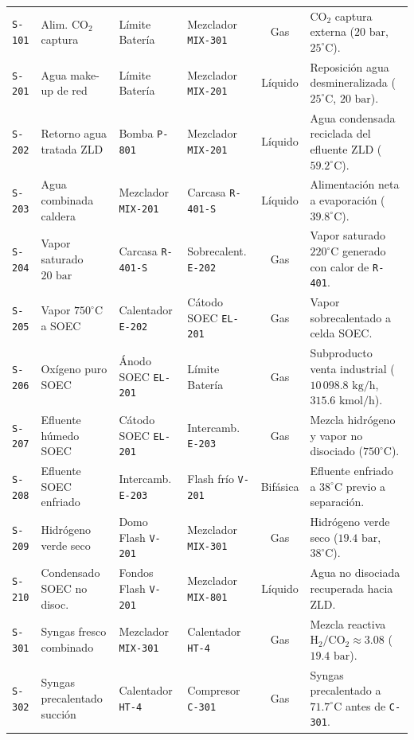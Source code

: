 \documentclass[11pt,letterpaper]{article}
\begin{document}
\begin{xltabular}{\textwidth}{l p{3.1cm} p{2.5cm} p{2.5cm} c X}
\texttt{S-101} & Alim. $\text{CO}_2$ captura & Límite Batería & Mezclador \texttt{MIX-301} & Gas & $\text{CO}_2$ captura externa ($20\text{ bar}$, $25^\circ\text{C}$). \\
\texttt{S-201} & Agua make-up de red & Límite Batería & Mezclador \texttt{MIX-201} & Líquido & Reposición agua desmineralizada ($25^\circ\text{C}$, $20\text{ bar}$). \\
\texttt{S-202} & Retorno agua tratada ZLD & Bomba \texttt{P-801} & Mezclador \texttt{MIX-201} & Líquido & Agua condensada reciclada del efluente ZLD ($59.2^\circ\text{C}$). \\
\texttt{S-203} & Agua combinada caldera & Mezclador \texttt{MIX-201} & Carcasa \texttt{R-401-S} & Líquido & Alimentación neta a evaporación ($39.8^\circ\text{C}$). \\
\texttt{S-204} & Vapor saturado $20\text{ bar}$ & Carcasa \texttt{R-401-S} & Sobrecalent. \texttt{E-202} & Gas & Vapor saturado $220^\circ\text{C}$ generado con calor de \texttt{R-401}. \\
\texttt{S-205} & Vapor $750^\circ\text{C}$ a SOEC & Calentador \texttt{E-202} & Cátodo SOEC \texttt{EL-201} & Gas & Vapor sobrecalentado a celda SOEC. \\
\texttt{S-206} & Oxígeno puro SOEC & Ánodo SOEC \texttt{EL-201} & Límite Batería & Gas & Subproducto venta industrial ($10\,098.8\text{ kg/h}$, $315.6\text{ kmol/h}$). \\
\texttt{S-207} & Efluente húmedo SOEC & Cátodo SOEC \texttt{EL-201} & Intercamb. \texttt{E-203} & Gas & Mezcla hidrógeno y vapor no disociado ($750^\circ\text{C}$). \\
\texttt{S-208} & Efluente SOEC enfriado & Intercamb. \texttt{E-203} & Flash frío \texttt{V-201} & Bifásica & Efluente enfriado a $38^\circ\text{C}$ previo a separación. \\
\texttt{S-209} & Hidrógeno verde seco & Domo Flash \texttt{V-201} & Mezclador \texttt{MIX-301} & Gas & Hidrógeno verde seco ($19.4\text{ bar}$, $38^\circ\text{C}$). \\
\texttt{S-210} & Condensado SOEC no disoc. & Fondos Flash \texttt{V-201} & Mezclador \texttt{MIX-801} & Líquido & Agua no disociada recuperada hacia ZLD. \\
\texttt{S-301} & Syngas fresco combinado & Mezclador \texttt{MIX-301} & Calentador \texttt{HT-4} & Gas & Mezcla reactiva $\text{H}_2/\text{CO}_2 \approx 3.08$ ($19.4\text{ bar}$). \\
\texttt{S-302} & Syngas precalentado succión & Calentador \texttt{HT-4} & Compresor \texttt{C-301} & Gas & Syngas precalentado a $71.7^\circ\text{C}$ antes de \texttt{C-301}. \\

\end{xltabular}
\end{document}
